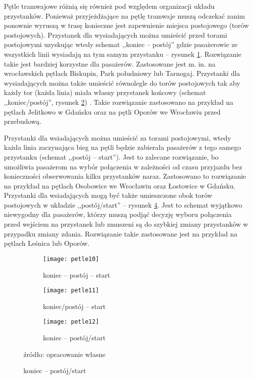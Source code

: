 \documentclass[twoside,12pt]{article}
\begin{document}
	Pętle tramwajowe różnią się również pod względem organizacji układu przystanków. Ponieważ przyjeżdżające na pętlę tramwaje muszą odczekać zanim ponownie wyruszą w trasę konieczne jest zapewnienie miejsca postojowego (torów postojowych). Przystanek dla wysiadających można umieścić przed torami postojowymi uzyskując wtedy schemat ,,koniec -- postój'' gdzie pasażerowie ze wszystkich linii wysiadają na tym samym przystanku -- rysunek \ref{petle4a}. Rozwiązanie takie jest bardziej korzystne dla pasażerów. Zastosowane jest m. in. na wrocławskich pętlach Biskupin, Park południowy lub Tarnogaj. Przystanki dla wysiadających można także umieścić równolegle do torów postojowych tak aby każdy tor (każda linia) miała własny przystanek końcowy (schemat ,,koniec\slash postój'', rysunek \ref{petle4b}) . Takie rozwiązanie zastosowano na przykład na pętlach Jelitkowo w Gdańsku oraz na pętli Oporów we Wrocławiu przed przebudową. 
	
	Przystanki dla wsiadających można umieścić za torami postojowymi, wtedy każda linia zaczynająca bieg na pętli będzie zabierała pasażerów z tego samego przystanku (schemat ,,postój -- start''). Jest to zalecane rozwiązanie, bo umożliwia pasażerom na wybór połączenia w zależności od czasu przyjazdu bez konieczności obserwowania kilku przystanków naraz. Zastosowano to rozwiązanie na przykład na pętlach Osobowice we Wrocławiu oraz Łostowice w Gdańsku. Przystanki dla wsiadających mogą być także umieszczone obok torów postojowych w układzie ,,postój\slash start'' -- rysunek \ref{petle4c}. Jest to schemat wyjątkowo niewygodny dla pasażerów, którzy muszą podjąć decyzję wyboru połączenia przed wejściem na przystanek lub zmuszeni są do szybkiej zmiany przystanków w przypadku zmiany zdania. Rozwiązanie takie zastosowane jest na przykład na pętlach Leśnica lub Oporów. 
	
		\begin{figure}[H]
	\centering
	\caption{Układ przystanków na pętli}
	\begin{subfigure}{.33\textwidth}
	  \centering
	  \caption{koniec -- postój -- start}
	  \texttt{[image: petle10]}
	  \label{petle4a}
	\end{subfigure}%
	\begin{subfigure}{.33\textwidth}
	  \centering
	  \caption{koniec\slash postój -- start}
	  \texttt{[image: petle11]}
	  \label{petle4b}
	\end{subfigure}%
	\begin{subfigure}{.33\textwidth}
	  \centering
	  \caption{koniec -- postój\slash start}
	  \texttt{[image: petle12]}
	  \label{petle4c}
	\end{subfigure}
	
	\footnotesize{źródło: opracowanie własne}
	\end{figure}
	
\end{document}
